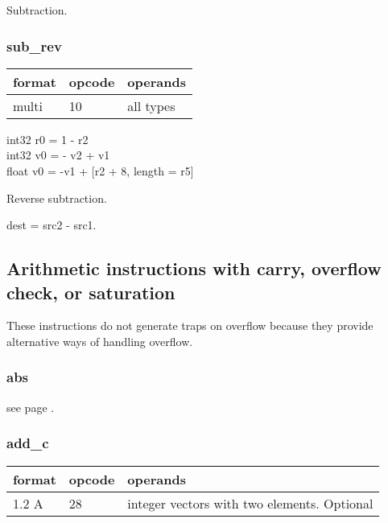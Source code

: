 \documentclass[forwardcom.tex]{subfiles}
\begin{document}
Subtraction.

\subsubsection{sub\_rev}
\label{table:subRevInstruction}
\begin{tabular}{|p{12mm}|p{12mm}|p{110mm}|}
\hline
\bfseries format & \bfseries opcode & \bfseries operands \\ \hline
multi & 10 & all types \\ \hline
\end{tabular}
\vspace{2mm}

int32 r0 = 1 - r2 \\
int32 v0 = - v2 + v1 \\
float v0 = -v1 + [r2 + 8, length = r5]
\vspace{2mm}

Reverse subtraction.
\vspace{2mm}

dest = src2 - src1.
\vspace{2mm}


\subsection{Arithmetic instructions with carry, overflow check, or saturation}
These instructions do not generate traps on overflow because they provide alternative ways of handling overflow.
\vspace{2mm}

\subsubsection{abs}
see page \pageref{table:absInstruction}.
\vspace{2mm}

\subsubsection{add\_c}
\label{table:addCInstruction}
\begin{tabular}{|p{12mm}|p{12mm}|p{110mm}|}
\hline
\bfseries format & \bfseries opcode & \bfseries operands \\ \hline
1.2 A & 28 & integer vectors with two elements. Optional \\ \hline
\end{tabular}
\vspace{2mm}
\end{document}
